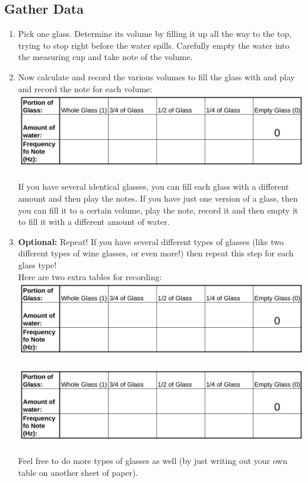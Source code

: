 \documentclass[12pt,noauthor,nooutcomes,hints,instructornotes]{ximera}%
\begin{document}
\subsection{Gather Data}
\begin{enumerate}

\item Pick one glass.  Determine its volume by filling it up all the way to the top, trying to stop right before the water spills. Carefully empty the water into the measuring cup and take note of the volume.

\item Now calculate and record the various volumes to fill the glass with and play and record the note for each volume:\\
\includegraphics[width=\textwidth]{Volume.png}\\
\\
If you have several identical glasses, you can fill each glass with a different amount and then play the notes.  If you have just one version of a glass, then you can fill it to a certain volume, play the note, record it and then empty it to fill it with a different amount of water.

\item \textbf{Optional:} Repeat! If you have several different types of glasses (like two different types of wine glasses, or even more!) then repeat this step for each glass type!\\
Here are two extra tables for recording:\\
\includegraphics[width=\textwidth]{Volume.png}\\
\\
\includegraphics[width=\textwidth]{Volume.png}\\
\\
Feel free to do more types of glasses as well (by just writing out your own table on another sheet of paper).

\end{enumerate}
\end{document}
